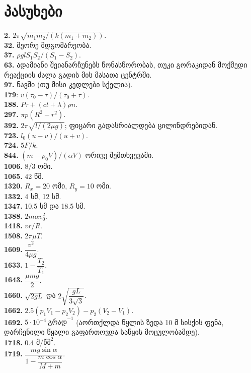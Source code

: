 \documentclass[12pt,a4paper,]{report}
\begin{document}
\chapter{პასუხები}
\textbf{2.} $2\pi\sqrt{m_1 m_2 / (k(m_1 + m_2))}$. \\
\textbf{32.} მეორე მდგომარეობა. \\
\textbf{37.} $\rho glS_1S_2/(S_1-S_2)$. \\
\textbf{63.} ადამიანი შეიანარჩუნებს წონასწორობას, თუკი გორაკიდან მოქმედი რეაქციის ძალა გადის მის მასათა ცენტრში. \\ 
\textbf{97.} ნავში (თუ მისი კედლები სქელია). \\
\textbf{179}: $v(\tau_0-\tau)/(\tau_0+\tau)$. \\
\textbf{188.} $P\tau+(ct+\lambda)\rho n$. \\
\textbf{297.} $\pi p(R^2-r^2)$. \\
\textbf{392.} $2\pi\sqrt{l/(2\mu g)}$; ფიცარი გადასრიალდება ცილინდრებიდან. \\
\textbf{723.} $l_0(u-v)/(u+v)$. \\
\textbf{724.} $5F/k$. \\
\textbf{844.} $(m-\rho_0 V)/(\alpha V)$ ორივე შემთხვევაში.\\
\textbf{1006.} 8/3 ომი. \\
\textbf{1065.} 42 წმ. \\
\textbf{1320.} $R_x=20$ ომი, $R_y=10$ ომი.\\
\textbf{1332.} 4 სმ, 12 სმ. \\
\textbf{1347.} 10.5 სმ და 18.5 სმ. \\
\textbf{1388.} $2m\alpha v_0^2$. \\
\textbf{1418.} $vr/R$. \\
\textbf{1508.} $2\pi\mu T$. \\
\textbf{1609.} $\dfrac{v^2}{4\mu g}$. \\
\textbf{1633.} $1-\dfrac{T_2}{T_1}$. \\
\textbf{1643.} $\dfrac{\mu m g}{2}.$\\
\textbf{1660.} $\sqrt{2gL}$ და $2\sqrt{\dfrac{gL}{3\sqrt{3}}}$. \\
\textbf{1662.} $2.5(p_1 V_1 - p_2 V_2) - p_2(V_2 - V_1)$. \\
\textbf{1692.} $5 \cdot 10^{-4}\ \text{გრად}^{-1}$ (აორთქლდა წყლის ზედა 10 მ სისქის ფენა, დარჩენილი წყალი გაფართოვდა საწყის მოცულობამდე).\\
\textbf{1718.} 0.4 $\text{მ}/\text{წმ}^2$. \\
\textbf{1719.} $\dfrac{mg\sin\alpha}{1-\dfrac{m\cos\alpha}{M+m}}$. \\
\end{document}

